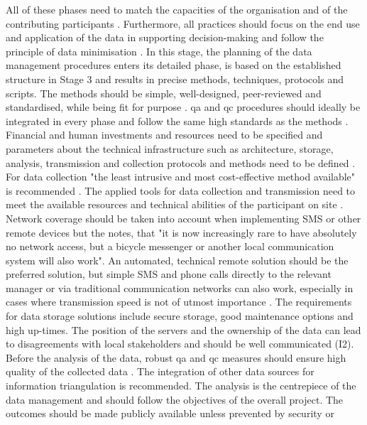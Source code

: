 All of these phases need to match the capacities of the organisation and of the contributing participants \autocite{ifrcCommunityBasedSurveillanceGuiding2017,minkmanCitizenScienceWater2015}. Furthermore, all practices should focus on the end use and application of the data in supporting decision-making and follow the principle of data minimisation \autocite{edpsGlossaryEuropeanData2023,ifrcCommunityBasedSurveillanceGuiding2017,minkmanCitizenScienceWater2015}. In this stage, the planning of the data management procedures enters its detailed phase, is based on the established structure in Stage 3 and results in precise methods, techniques, protocols and scripts. The methods should be simple, well-designed, peer-reviewed and standardised, while being fit for purpose \autocite{fraislCitizenScienceEnvironmental2022,ifrcCommunityBasedSurveillanceGuiding2017,silvertownNewDawnCitizen2009,whitelawEstablishingCanadianCommunity2003}. \acrshort{qa} and \acrshort{qc} procedures should ideally be integrated in every phase and follow the same high standards as the methods \autocite{fraislCitizenScienceEnvironmental2022,mackechnieRoleBigSociety2011,sharpeCommunityBasedEcological2006,silvertownNewDawnCitizen2009}. Financial and human investments and resources need to be specified and parameters about the technical infrastructure such as architecture, storage, analysis, transmission and collection protocols and methods need to be defined \autocite{fraislCitizenScienceEnvironmental2022,sharpeCommunityBasedEcological2006}. For data collection "the least intrusive and most cost-effective method available" is recommended \autocite[27]{ifrcCommunityBasedSurveillanceGuiding2017}. The applied tools for data collection and transmission need to meet the available resources and technical abilities of the participant on site \autocite{ifrcCommunityBasedSurveillanceGuiding2017,minkmanCitizenScienceWater2015}. Network coverage should be taken into account when implementing SMS or other remote devices but the \autocite[26]{ifrcCommunityBasedSurveillanceGuiding2017} notes, that "it is now increasingly rare to have absolutely no network access, but a bicycle messenger or another local communication system will also work". An automated, technical remote solution should be the preferred solution, but simple SMS and phone calls directly to the relevant manager or via traditional communication networks can also work, especially in cases where transmission speed is not of utmost importance \autocite{gualazziniEWEAEarlyWarning2021,ifrcCommunityBasedSurveillanceGuiding2017}. The requirements for data storage solutions include secure storage, good maintenance options and high up-times. The position of the servers and the ownership of the data can lead to disagreements with local stakeholders and should be well communicated (I2). Before the analysis of the data, robust \acrshort{qa} and \acrshort{qc} measures should ensure high quality of the collected data \autocite{fraislCitizenScienceEnvironmental2022,sharpeCommunityBasedEcological2006}. The integration of other data sources for information triangulation is recommended. The analysis is the centrepiece of the data management and should follow the objectives of the overall project. The outcomes should be made publicly available unless prevented by security or 